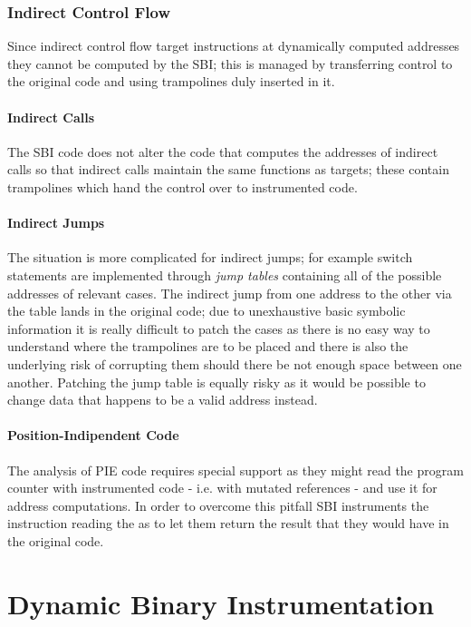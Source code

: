 \subsubsection{Indirect Control Flow}
Since indirect control flow target instructions at dynamically computed addresses they cannot be computed by the SBI;
this is managed by transferring control to the original code and using trampolines duly inserted in it. 
\paragraph{Indirect Calls} The SBI code does not alter the code that computes the addresses of indirect calls so that
indirect calls maintain the same functions as targets; these contain trampolines which hand the control over to
instrumented code.
\paragraph{Indirect Jumps} The situation is more complicated for indirect jumps; for example {\ttfamily switch}
statements are implemented through \textit{jump tables} containing all of the possible addresses of relevant {\ttfamily
case}s. The indirect jump from one address to the other via the table lands in the original code; due to unexhaustive
basic symbolic information it is really difficult to patch the cases as there is no easy way to understand where the
trampolines are to be placed and there is also the underlying risk of corrupting them should there be not enough space
between one another. Patching the jump table is equally risky as it would be possible to change data that happens to be
a valid address instead.
\paragraph{Position-Indipendent Code} The analysis of PIE code requires special support as they might read the program
counter with instrumented code - i.e. with mutated references - and use it for address computations. In order to
overcome this pitfall SBI instruments the instruction reading the  as to let them return the result that they
would have in the original code.



\section{Dynamic Binary Instrumentation}
